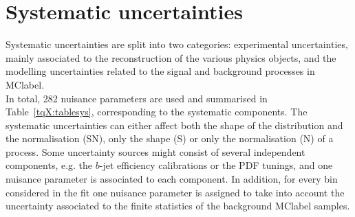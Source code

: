 \section{Systematic uncertainties}
Systematic uncertainties are split into two categories: experimental uncertainties, mainly associated to the reconstruction of the various physics objects, and the modelling uncertainties related to the signal and background processes in \acrshort{MClabel}.\\

In total, 282 nuisance parameters are used and summarised in Table~\ref{tqX:tablesys}, corresponding to the systematic components. The systematic uncertainties can either affect both the shape of the distribution and the normalisation (SN), only the shape (S) or only the normalisation (N) of a process. Some uncertainty sources might consist of several independent components, e.g. the $b$-jet efficiency calibrations or the PDF tunings, and one nuisance parameter is associated to each component. In addition, for every bin considered in the fit one nuisance parameter is assigned to take into account the uncertainty associated to the finite statistics of the background \acrshort{MClabel} samples.\\

